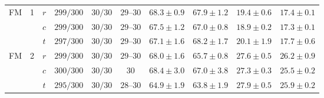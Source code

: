 \begin{table}[htpb]
\begin{tabularx}{\linewidth}{@{}L r c rrc rr rr@{}}
    \midrule
    FM     & 1 & $r$ & $299/300$ & $30/30$ & $29$--$30$ & $68.3 \pm 0.9$ & $67.9 \pm 1.2$ & $19.4 \pm 0.6$ & $17.4 \pm 0.1$ \\
           &   & $c$ & $299/300$ & $30/30$ & $29$--$30$ & $67.5 \pm 1.2$ & $67.0 \pm 0.8$ & $18.9 \pm 0.2$ & $17.3 \pm 0.1$ \\
           &   & $t$ & $297/300$ & $30/30$ & $29$--$30$ & $67.1 \pm 1.6$ & $68.2 \pm 1.7$ & $20.1 \pm 1.9$ & $17.7 \pm 0.6$ \\
    FM     & 2 & $r$ & $299/300$ & $30/30$ & $29$--$30$ & $68.0 \pm 1.6$ & $65.7 \pm 0.8$ & $27.6 \pm 0.5$ & $26.2 \pm 0.9$ \\
           &   & $c$ & $300/300$ & $30/30$ & $30$ & $68.4 \pm 3.0$ & $67.0 \pm 3.8$ & $27.3 \pm 0.3$ & $25.5 \pm 0.2$ \\
           &   & $t$ & $295/300$ & $30/30$ & $28$--$30$ & $64.9 \pm 1.9$ & $63.8 \pm 1.9$ & $27.9 \pm 0.5$ & $25.9 \pm 0.2$ \\
    \bottomrule
  \end{tabularx}
\end{table}

